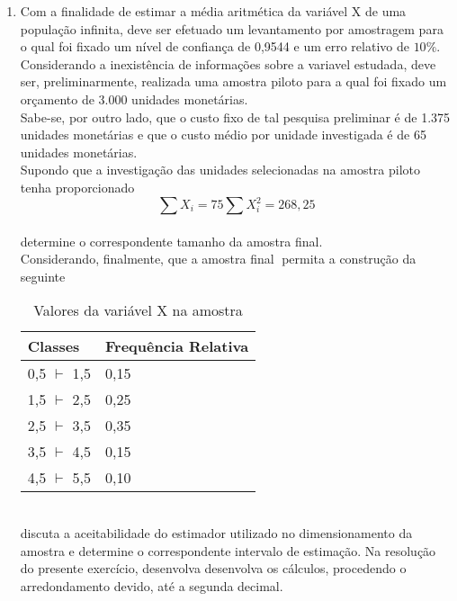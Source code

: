 \begin{enumerate}[resume]
\item Com a finalidade de estimar a média aritmética da variável X de uma população infinita, deve ser efetuado um levantamento por amostragem para o qual foi fixado um nível de confiança de 0,9544 e um erro relativo de $10\%$. Considerando a inexistência de informações sobre a variavel estudada, deve ser, preliminarmente, realizada uma amostra piloto para a qual foi fixado um orçamento de 3.000 unidades monetárias.\\
Sabe-se, por outro lado, que o custo fixo de tal pesquisa preliminar é de 1.375 unidades monetárias e que o custo médio por unidade investigada é de 65 unidades monetárias.\\
Supondo que a investigação das unidades selecionadas na amostra piloto tenha proporcionado\\
$$\sum X_{i} = 75  \sum X_{i}^{2} = 268,25$$\\
determine o correspondente tamanho da amostra final.\\
Considerando, finalmente, que a amostra final permita a construção da seguinte\\
	\begin{table}[!htb]
	\centering
	\caption{Valores da variável X na amostra}
	\vspace{0.5cm}
	\begin{tabular}{ll}
	Classes & Frequência Relativa \\
	\hline 
	0,5 $\vdash$ 1,5 & 0,15  \\
	1,5 $\vdash$ 2,5 & 0,25  \\
	2,5 $\vdash$ 3,5 & 0,35  \\
	3,5 $\vdash$ 4,5 & 0,15 \\
	4,5 $\vdash$ 5,5 & 0,10  \\
	\end{tabular}
	\end{table}\\
discuta a aceitabilidade do estimador utilizado no dimensionamento da amostra e determine o correspondente intervalo de estimação. Na resolução do presente exercício, desenvolva desenvolva os cálculos, procedendo o arredondamento devido, até a segunda decimal.


\end{enumerate}
